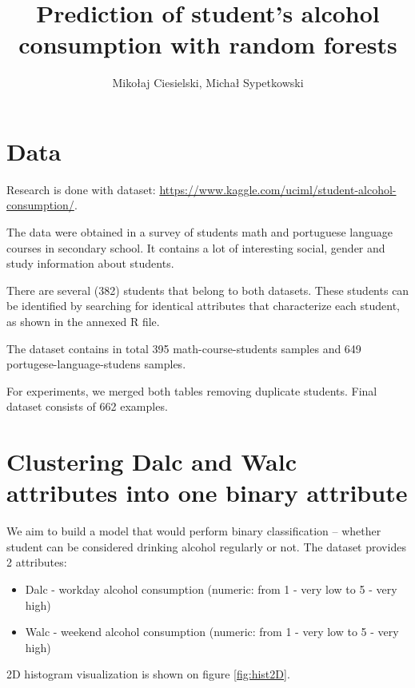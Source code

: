 \documentclass[a4paper]{article}
\begin{document}
\title{Prediction of student's alcohol consumption with random forests}

\author{Mikołaj Ciesielski, Michał Sypetkowski}
\maketitle


\begin{multicols}{2}

\section{Data}

Research is done with dataset: \url{https://www.kaggle.com/uciml/student-alcohol-consumption/}.

The data were obtained in a survey of students
math and portuguese language courses in secondary school.
It contains a lot of interesting social,
gender and study information about students.

There are several (382) students that belong to both datasets.
These students can be identified by searching for identical attributes
that characterize each student, as shown in the annexed R file.

The dataset contains in total 395 math-course-students samples and 
649 portugese-language-studens samples.

For experiments, we merged both tables removing duplicate students.
Final dataset consists of 662 examples.


\section{Clustering Dalc and Walc attributes into one binary attribute}

We aim to build a model that would perform binary classification --
whether student can be considered drinking alcohol regularly or not.
The dataset provides 2 attributes:
\begin{itemize}
    \item Dalc - workday alcohol consumption (numeric: from 1 - very low to 5 - very high)
    \item Walc - weekend alcohol consumption (numeric: from 1 - very low to 5 - very high)
\end{itemize}
2D histogram visualization is shown on figure \ref{fig:hist2D}.


\end{multicols}
\end{document}
